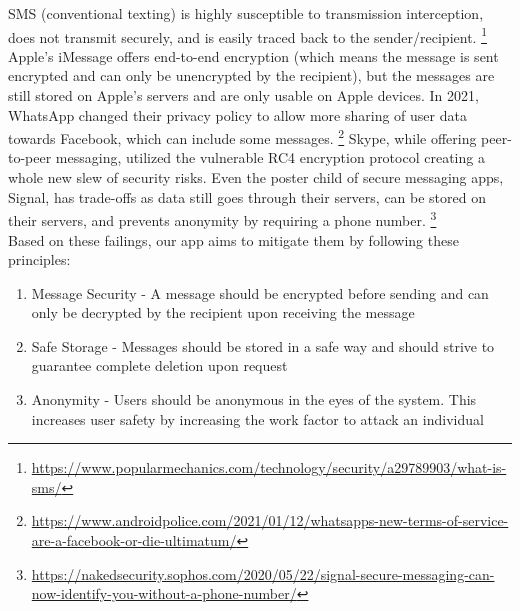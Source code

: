 \documentclass[titlepage]{article}
\begin{document}
      SMS (conventional texting) is highly susceptible to transmission interception, does not transmit securely, and is easily traced back to the sender/recipient.
      \footnote{\url{https://www.popularmechanics.com/technology/security/a29789903/what-is-sms/}}
      Apple's iMessage offers end-to-end encryption (which means the message is sent encrypted and can only be unencrypted by the recipient), but the messages are still stored on Apple's servers and are only usable on Apple devices.
      In 2021, WhatsApp changed their privacy policy to allow more sharing of user data towards Facebook, which can include some messages.
      \footnote{\url{https://www.androidpolice.com/2021/01/12/whatsapps-new-terms-of-service-are-a-facebook-or-die-ultimatum/}}
      Skype, while offering peer-to-peer messaging, utilized the vulnerable RC4 encryption protocol creating a whole new slew of security risks.
      Even the poster child of secure messaging apps, Signal, has trade-offs as data still goes through their servers, can be stored on their servers, and prevents anonymity by requiring a phone number.
      \footnote{\url{https://nakedsecurity.sophos.com/2020/05/22/signal-secure-messaging-can-now-identify-you-without-a-phone-number/}}\\

      Based on these failings, our app aims to mitigate them by following these principles:
      \begin{enumerate}
          \item Message Security - A message should be encrypted before sending and can only be decrypted by the recipient upon receiving the message
          \item Safe Storage - Messages should be stored in a safe way and should strive to guarantee complete deletion upon request
          \item Anonymity - Users should be anonymous in the eyes of the system. This increases user safety by increasing the work factor to attack an individual
      \end{enumerate}
\end{document}
